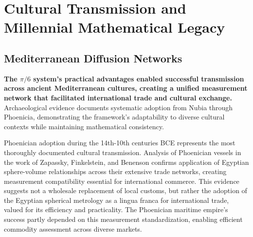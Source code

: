 \documentclass[11pt]{article}
\begin{document}
\section{Cultural Transmission and Millennial Mathematical Legacy}

\subsection{Mediterranean Diffusion Networks}

\textbf{The $\pi/6$ system's practical advantages enabled successful transmission across ancient Mediterranean cultures, creating a unified measurement network that facilitated international trade and cultural exchange.} Archaeological evidence documents systematic adoption from Nubia through Phoenicia, demonstrating the framework's adaptability to diverse cultural contexts while maintaining mathematical consistency.

Phoenician adoption during the 14th-10th centuries BCE represents the most thoroughly documented cultural transmission. Analysis of Phoenician vessels in the work of Zapassky, Finkelstein, and Benenson \cite{zapassky2012ancient} confirms application of Egyptian sphere-volume relationships across their extensive trade networks, creating measurement compatibility essential for international commerce. This evidence suggests not a wholesale replacement of local customs, but rather the adoption of the Egyptian spherical metrology as a lingua franca for international trade, valued for its efficiency and practicality. The Phoenician maritime empire's success partly depended on this measurement standardization, enabling efficient commodity assessment across diverse markets.
\end{document}
